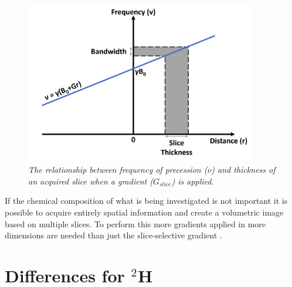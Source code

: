 \begin{figure}
    \centering
    \includegraphics[width=0.9\textwidth]{Figures/Theory/Gradient.png}
    \caption{\textit{The relationship between frequency of precession ($\nu$) and thickness of an acquired slice when a gradient ($G_{slice}$) is applied.}}
    \label{fig:theory:Grad}
\end{figure}

If the chemical composition of what is being investigated is not important it is possible to acquire entirely spatial information and create a volumetric image based on multiple slices. To perform this more gradients applied in more dimensions are needed than just the slice-selective gradient \cite{deGraaf2019InSpectroscopy}.

\section{Differences for $^2$H}

